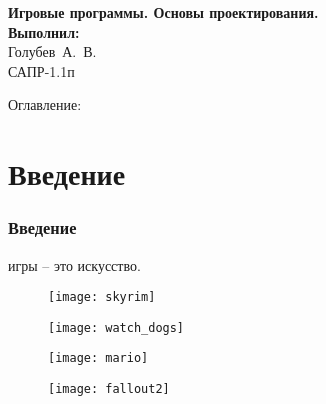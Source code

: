 \begin{frame}
    \begin{center}
        \vspace{3.0cm}
        \normalsize
        \textbf{Игровые программы. Основы проектирования.} \\
        \vspace{1.5cm}
        \raggedleft\small\textbf{Выполнил:}\\Голубев~А.~В.\\САПР-1.1п\\
        \vspace{1.8cm}
        \vspace{\fill}
         \the\year
    \end{center}
\end{frame}

\begin{frame}
    Оглавление:
    \tableofcontents
\end{frame}

\section{Введение}
\begin{frame}
    \frametitle{Введение}
     игры -- это искусство.
    \begin{figure}
        \begin{minipage}{0.47\textwidth}
            \texttt{[image: skyrim]}
        \end{minipage}
        \begin{minipage}{0.51\textwidth}
            \texttt{[image: watch\_dogs]}
        \end{minipage}
        \begin{minipage}{0.47\textwidth}
            \texttt{[image: mario]}
        \end{minipage}
        \begin{minipage}{0.51\textwidth}
            \texttt{[image: fallout2]}
        \end{minipage}
    \end{figure}
\end{frame}

